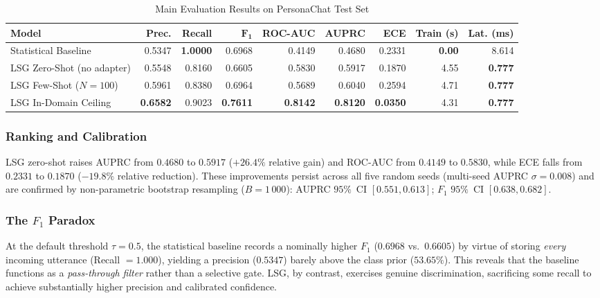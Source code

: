 \documentclass[conference]{IEEEtran}
\begin{document}
\begin{table}[t]
  \centering
  \caption{Main Evaluation Results on PersonaChat Test Set}
  \label{tab:main}
  \renewcommand{\arraystretch}{1.2}
  \begin{tabular}{@{}lrrrrrrrr@{}}
    \toprule
    \textbf{Model} & \textbf{Prec.} & \textbf{Recall} & $\bm{F_1}$
      & \textbf{ROC-AUC} & \textbf{AUPRC} & \textbf{ECE}
      & \textbf{Train (s)} & \textbf{Lat. (ms)} \\
    \midrule
    Statistical Baseline
      & 0.5347 & \textbf{1.0000} & 0.6968
      & 0.4149 & 0.4680 & 0.2331 & \textbf{0.00} & 8.614 \\
    LSG Zero-Shot (no adapter)
      & 0.5548 & 0.8160 & 0.6605
      & 0.5830 & 0.5917 & 0.1870 & 4.55 & \textbf{0.777} \\
    LSG Few-Shot ($N{=}100$)
      & 0.5961 & 0.8380 & 0.6964
      & 0.5689 & 0.6040 & 0.2594 & 4.71 & \textbf{0.777} \\
    LSG In-Domain Ceiling
      & \textbf{0.6582} & 0.9023 & \textbf{0.7611}
      & \textbf{0.8142} & \textbf{0.8120} & \textbf{0.0350}
      & 4.31 & \textbf{0.777} \\
    \bottomrule
  \end{tabular}
\end{table}

\subsubsection{Ranking and Calibration}
LSG zero-shot raises AUPRC from $0.4680$ to $0.5917$
($+26.4\%$ relative gain) and ROC-AUC from $0.4149$ to
$0.5830$, while ECE falls from $0.2331$ to $0.1870$
($-19.8\%$ relative reduction).
These improvements persist across all five random seeds
(multi-seed AUPRC $\sigma = 0.008$) and are confirmed by
non-parametric bootstrap resampling ($B{=}1\,000$):
AUPRC $95\%$~CI $[0.551, 0.613]$;
$F_1$ $95\%$~CI $[0.638, 0.682]$.

\subsubsection{The $F_1$ Paradox}
At the default threshold $\tau{=}0.5$, the statistical
baseline records a nominally higher $F_1$ ($0.6968$
vs.~$0.6605$) by virtue of storing \emph{every} incoming
utterance (Recall $= 1.000$), yielding a precision
($0.5347$) barely above the class prior ($53.65\%$).
This reveals that the baseline functions as a
\emph{pass-through filter} rather than a selective gate.
LSG, by contrast, exercises genuine discrimination,
sacrificing some recall to achieve substantially higher
precision and calibrated confidence.
\end{document}
